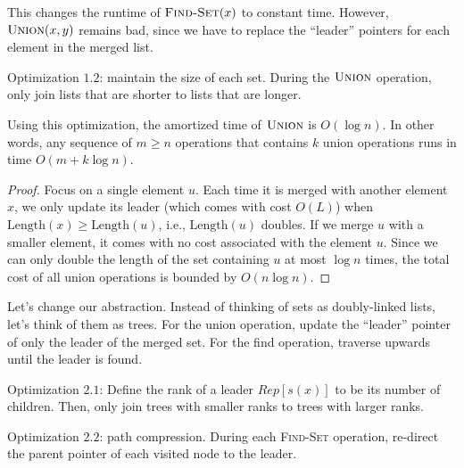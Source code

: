 This changes the runtime of $\textsc{Find-Set}(x)$ to constant time. However, $\textsc{Union}(x,y)$ remains bad, since we have to replace the ``leader'' pointers for each element in the merged list. 

\begin{example}
\exlabel

Optimization $1.2$: maintain the size of each set. During the $\textsc{Union}$ operation, only join lists that are shorter to lists that are longer. 
\end{example}

\begin{theorem}
\lemlabel

Using this optimization, the amortized time of $\textsc{Union}$ is $O(\log n)$. In other words, any sequence of $m\geq n$ operations that contains $k$ union operations runs in time $O(m + k\log n)$. 
\end{theorem}

\begin{proof}
Focus on a single element $u$. Each time it is merged with another element $x$, we only update its leader (which comes with cost $O(L)$) when $\text{Length}(x)\geq \text{Length}(u)$, i.e., $\text{Length}(u)$ doubles. If we merge $u$ with a smaller element, it comes with no cost associated with the element $u$. Since we can only double the length of the set containing $u$ at most $\log n$ times, the total cost of all union operations is bounded by $O(n\log n)$.
\end{proof}

Let's change our abstraction. Instead of thinking of sets as doubly-linked lists, let's think of them as trees. For the union operation, update the ``leader'' pointer of only the leader of the merged set. For the find operation, traverse upwards until the leader is found. 

\begin{example}
\exlabel

Optimization $2.1$: Define the \ac{rank} of a leader $Rep[s(x)]$ to be its number of children. Then, only join trees with smaller ranks to trees with larger ranks. 
\end{example}

\begin{example}
\exlabel

Optimization $2.2$: \ac{path compression}. During each \textsc{Find-Set} operation, re-direct the parent pointer of each visited node to the leader. 
\end{example}

